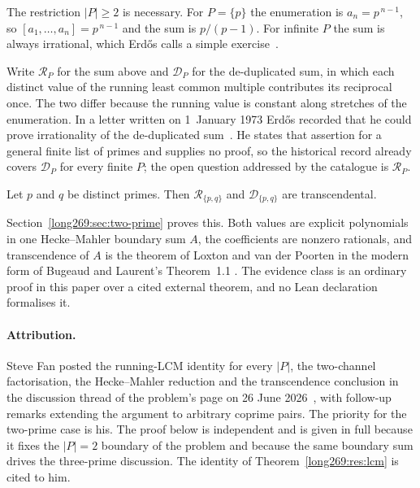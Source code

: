 \documentclass[11pt]{article}
\begin{document}
The restriction $|P|\ge2$ is necessary.  For $P=\{p\}$ the enumeration is
$a_n=p^{\,n-1}$, so $[a_1,\ldots,a_n]=p^{\,n-1}$ and the sum is $p/(p-1)$.  For
infinite $P$ the sum is always irrational, which Erd\H{o}s calls a simple
exercise~\cite[p.~106]{erdos1988}.

Write $\mathcal R_P$ for the sum above and $\mathcal D_P$ for the
de-duplicated sum, in which each distinct value of the running least common
multiple contributes its reciprocal once.  The two differ because the running
value is constant along stretches of the enumeration.  In a letter written on
1~January 1973 Erd\H{o}s recorded that he could prove irrationality of the
de-duplicated sum~\cite[p.~335]{erdos1974letter}.  He states that assertion for
a general finite list of primes and supplies no proof, so the historical record
already covers $\mathcal D_P$ for every finite $P$; the open question addressed
by the catalogue is $\mathcal R_P$.

\begin{theorem}\label{long269:res:lead-two-prime}
Let $p$ and $q$ be distinct primes.  Then $\mathcal R_{\{p,q\}}$ and
$\mathcal D_{\{p,q\}}$ are transcendental.
\end{theorem}

Section~\ref{long269:sec:two-prime} proves this.  Both values are explicit polynomials
in one Hecke--Mahler boundary sum $A$, the coefficients are nonzero rationals,
and transcendence of $A$ is the theorem of Loxton and van der Poorten
\cite[p.~40, Theorem~8]{loxtonvdp1977} in the modern form of Bugeaud and Laurent's
Theorem~1.1 \cite[p.~61, Theorem~1.1]{bugeaudlaurent2023}.  The evidence class
is an ordinary proof in this paper over a cited external theorem, and no Lean
declaration formalises it.

\paragraph{Attribution.}
Steve Fan posted the running-LCM identity for every $|P|$, the two-channel
factorisation, the Hecke--Mahler reduction and the transcendence conclusion in
the discussion thread of the problem's page on 26 June
2026~\cite{fan2026comment}, with follow-up remarks extending the argument to
arbitrary coprime pairs.  The priority for the two-prime case is his.  The
proof below is independent and is given in full because it fixes the $|P|=2$
boundary of the problem and because the same boundary sum drives the
three-prime discussion.  The identity of Theorem~\ref{long269:res:lcm} is cited to him.
\end{document}
